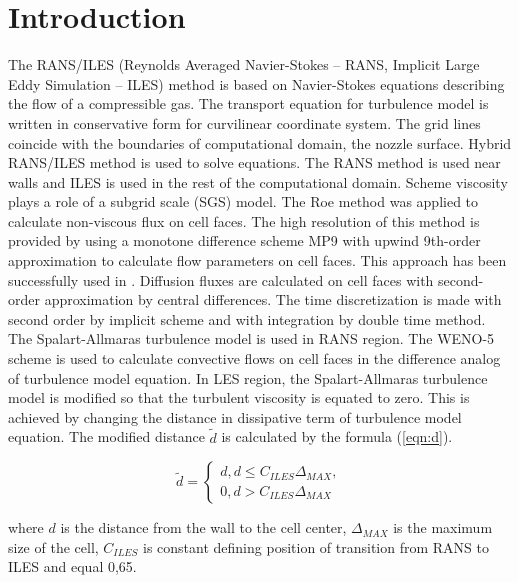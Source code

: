 \documentclass[
11pt,%
tightenlines,%
twoside,%
onecolumn,%
nofloats,%
nobibnotes,%
nofootinbib,%
superscriptaddress,%
noshowpacs,%
centertags]%
{revtex4}
\begin{document}
\maketitle


\section{Introduction}

The RANS/ILES (Reynolds Averaged Navier-Stokes -- RANS, Implicit Large Eddy Simulation -- ILES) method is based on Navier-Stokes equations describing the flow of a compressible gas.
The transport equation for turbulence model is written in conservative form for curvilinear coordinate system.
The grid lines coincide with the boundaries of computational domain, the nozzle surface.
Hybrid RANS/ILES method \cite{i1,Ben_Lyub_Chest_RANS_ILES} is used to solve equations.
The RANS method is used near walls and ILES is used in the rest of the computational domain.
Scheme viscosity plays a role of a subgrid scale (SGS) model.
The Roe method was applied to calculate non-viscous flux on cell faces.
The high resolution of this method is provided by using a monotone difference scheme MP9 \cite{i2} with upwind 9th-order approximation to calculate flow parameters on cell faces.
This approach has been successfully used in \cite{i3}.
Diffusion fluxes are calculated on cell faces with second-order approximation by central differences.
The time discretization is made with second order by implicit scheme and with integration by double time method.
The Spalart-Allmaras turbulence model is used in RANS region.
The WENO-5 scheme \cite{i2} is used to calculate convective flows on cell faces in the difference analog of turbulence model equation.
In LES region, the Spalart-Allmaras turbulence model is modified so that the turbulent viscosity is equated to zero.
This is achieved by changing the distance in dissipative term of turbulence model equation. The modified distance $\tilde{d}$ is calculated by the formula (\ref{eqn:d}).

\begin{equation}
\label{eqn:d}
\tilde{d} = 
\begin{cases}
d, d \le C_{ILES}\Delta_{MAX},\\
0, d > C_{ILES}\Delta_{MAX}
\end{cases}
\end{equation}

where $d$ is the distance from the wall to the cell center, $\Delta_{MAX}$ is the maximum size of the cell, $C_{ILES}$ is constant defining position of transition from RANS to ILES and equal 0,65.
\end{document}
